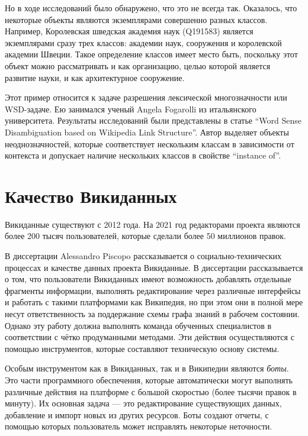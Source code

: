 Но в ходе исследований было обнаружено, что это не всегда так. Оказалось, что некоторые объекты являются экземплярами совершенно разных классов. Например, Королевская шведская академия наук (Q191583) является экземплярами сразу трех классов: академии наук, сооружения и королевской академии Швеции. Такое определение классов имеет место быть, поскольку этот объект можно рассматривать и как организацию, целью которой является развитие науки, и как архитектурное сооружение. 

Этот пример относится к задаче разрешения лексической многозначности или WSD-задаче. Ею занимался ученый Angela Fogarolli из итальянского университета. Результаты исследований были представлены в статье ``Word Sense Disambiguation based on Wikipedia Link Structure''\cite{Fogarolli}. Автор выделяет объекты неоднозначностей, которые соответствует нескольким классам в зависимости от контекста и допускает наличие нескольких классов в свойстве ``instance of''.
\section{Качество Викиданных}
Викиданные существуют с 2012 года. На 2021 год редакторами проекта являются более 200 тысяч пользователей, которые сделали более 50 миллионов правок.

В диссертации Alessandro Piscopo\cite{Piscopo} рассказывается о социально-технических процессах и качестве данных проекта Викиданные. В диссертации рассказывается о том, что пользователи Викиданных имеют возможность добавлять отдельные фрагменты информации, выполнять редактирование через различные интерфейсы и работать с такими платформами как Википедия, но при этом они в полной мере несут ответственность за поддержание схемы графа знаний в рабочем состоянии. Однако эту работу должна выполнять команда обученных специалистов в соответствии с чётко продуманными методами. Эти действия осуществляются с помощью инструментов, которые составляют техническую основу системы.

Особым инструментом как в Викиданных, так и в Википедии являются \textit{боты}\footnotemark.  Это части программного обеспечения, которые автоматически могут выполнять различные действия на платформе с большой скоростью (более тысячи правок в минуту). Их основная задача --- это редактирование существующих данных, добавление и импорт новых из других ресурсов. Боты создают отчеты, с помощью которых пользователь может исправлять некоторые неточности. 

